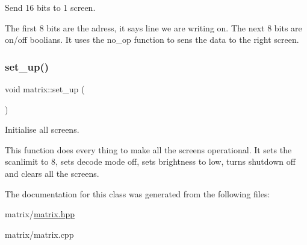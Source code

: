 Send 16 bits to 1 screen. 

The first 8 bits are the adress, it says line we are writing on. The next 8 bits are on/off boolians. It uses the no\+\_\+op function to sens the data to the right screen. \mbox{\label{classmatrix_aa0f47978368c703d5fb2e5cdbdab2337}} 
\subsubsection{\texorpdfstring{set\+\_\+up()}{set\_up()}}
{\footnotesize\ttfamily void matrix\+::set\+\_\+up (\begin{DoxyParamCaption}{ }\end{DoxyParamCaption})}



Initialise all screens. 

This function does every thing to make all the screens operational. It sets the scanlimit to 8, sets decode mode off, sets brightness to low, turns shutdown off and clears all the screens. 

The documentation for this class was generated from the following files\+:\begin{DoxyCompactItemize}
\item 
matrix/\hyperlink{matrix_8hpp}{matrix.\+hpp}\item 
matrix/matrix.\+cpp\end{DoxyCompactItemize}
